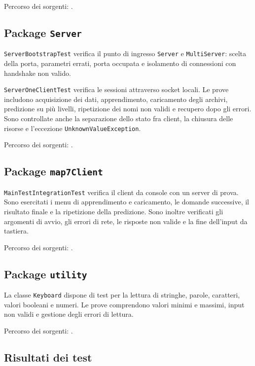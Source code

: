\documentclass[11pt,a4paper]{article}
\begin{document}
Percorso dei sorgenti: .

\subsection*{Package \texttt{Server}}

\texttt{ServerBootstrapTest} verifica il punto di ingresso \texttt{Server} e
\texttt{MultiServer}: scelta della porta, parametri errati, porta occupata e
isolamento di connessioni con handshake non valido.

\texttt{ServerOneClientTest} verifica le sessioni attraverso socket locali.
Le prove includono acquisizione dei dati, apprendimento, caricamento degli
archivi, predizione su più livelli, ripetizione dei nomi non validi e recupero
dopo gli errori. Sono controllate anche la separazione dello stato fra client,
la chiusura delle risorse e l'eccezione \texttt{UnknownValueException}.

Percorso dei sorgenti: .

\subsection*{Package \texttt{map7Client}}

\texttt{MainTestIntegrationTest} verifica il client da console con un server di
prova. Sono esercitati i menu di apprendimento e caricamento, le domande
successive, il risultato finale e la ripetizione della predizione. Sono inoltre
verificati gli argomenti di avvio, gli errori di rete, le risposte non valide e la
fine dell'input da tastiera.

Percorso dei sorgenti: .

\subsection*{Package \texttt{utility}}

La classe \texttt{Keyboard} dispone di test per la lettura di stringhe, parole,
caratteri, valori booleani e numeri. Le prove comprendono valori minimi e massimi,
input non validi e gestione degli errori di lettura.

Percorso dei sorgenti: .

\clearpage
\subsection*{Risultati dei test}
\end{document}

